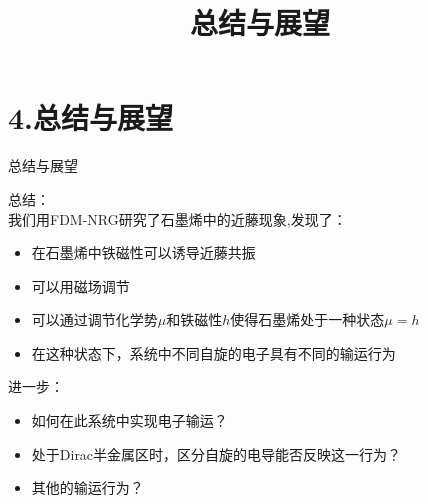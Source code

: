 \documentclass[9pt,t]{beamer} %
\begin{document}
\section{4.总结与展望}
\title{总结与展望}
\begin{frame}[t]{总结与展望}
\vspace{0.3cm}
\qquad %

\vspace{0.1cm}
总结：\\
\qquad 我们用FDM-NRG研究了石墨烯中的近藤现象,发现了：
\vspace{0.2cm}
\begin{itemize}
\item 在石墨烯中铁磁性可以诱导近藤共振
\item 可以用磁场调节
\item 可以通过调节化学势$\mu$和铁磁性$h$使得石墨烯处于一种状态$\mu=h$
\item 在这种状态下，系统中不同自旋的电子具有不同的输运行为
\end{itemize}

\vspace{0.3cm}
进一步：
\begin{itemize}
\item 如何在此系统中实现电子输运？
\item 处于Dirac半金属区时，区分自旋的电导能否反映这一行为？
\item 其他的输运行为？
\end{itemize}

\end{frame}



\end{document}
